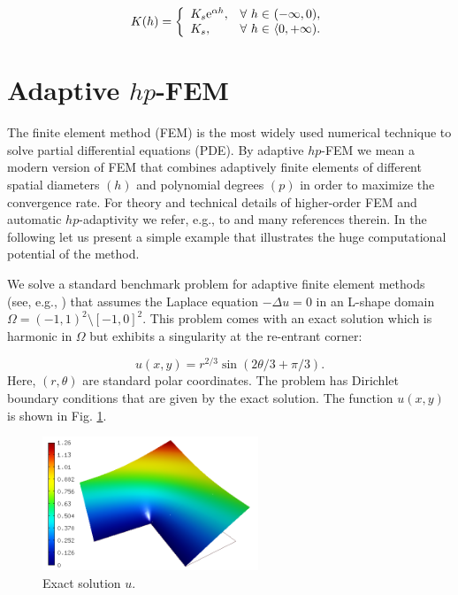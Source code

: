 \documentclass[final,3p,times,twocolumn]{elsarticle}
\begin{document}
  \begin{equation}
  \label{gardner-K}
  K(h) = \left\{
    \begin{array}{l l}
    K_s \textrm{e}^{\alpha h},  &  \mbox{$\forall$  $h \in$ $(-\infty,0)$},\\
    K_s, & \mbox{$\forall$   $h \in$ $\langle 0, +\infty)$}.
    \end{array} \right.
    \end{equation}




\section{Adaptive $hp$-FEM}
\label{sec:hpfem}

The finite element method (FEM) is the most widely used numerical technique
to solve partial differential equations (PDE). 
By adaptive $hp$-FEM we mean a modern version of FEM that combines
adaptively finite elements of different spatial diameters $(h)$ and polynomial
degrees $(p)$ in order to maximize the convergence rate.
For theory and technical details of higher-order FEM
and automatic $hp$-adaptivity we refer, e.g., to \cite{sosedo} 
and many references therein. In the following let us present
a simple example that illustrates the huge computational potential of 
the method. 

We solve a standard benchmark problem for adaptive finite element 
methods (see, e.g., \cite{sode}) that 
assumes the Laplace equation $-\Delta u = 0$ in an L-shape domain
$\Omega = (-1, 1)^2 \setminus [-1, 0]^2$. This problem comes with an exact 
solution which is harmonic in $\Omega$ but exhibits a singularity at the 
re-entrant corner:

$$
u(x,y) = r^{2/3} \sin(2 \theta / 3 + \pi / 3).
$$
Here, $(r, \theta)$ are standard polar coordinates. The problem has 
Dirichlet boundary conditions that are given by the exact solution. 
The function $u(x, y)$ is shown in Fig. \ref{fig:lshape-exact}. 


\begin{figure}[!ht]
\begin{center}
\includegraphics[height=4cm]{lshape-exact.png}
\end{center}
\vspace{-4mm}
\caption{Exact solution $u$.}
\label{fig:lshape-exact}
\end{figure}
\end{document}
